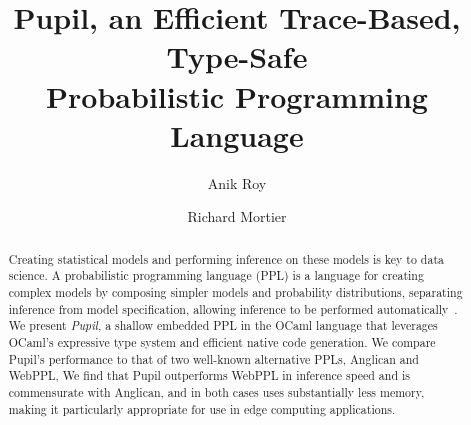 \documentclass[sigconf]{acmart}
\newcommand{\pupil}{Pupil\xspace}
\begin{document}
\title{
  \pupil, an Efficient Trace-Based, Type-Safe \\
  Probabilistic Programming Language
}

\author{Anik Roy}

\author{Richard Mortier}


\begin{abstract}
  Creating statistical models and performing inference on these models is key to data science. A probabilistic programming language (PPL) is a language for creating complex models by composing simpler models and probability distributions, separating inference from model specification, allowing inference to be performed automatically~\cite{gordon2014probabilistic}. We present \emph{\pupil}, a shallow embedded PPL in the OCaml language that leverages OCaml's expressive type system and efficient native code generation. We compare \pupil's performance to that of two well-known alternative PPLs, Anglican and WebPPL, We find that \pupil outperforms WebPPL in inference speed and is commensurate with Anglican, and in both cases uses substantially less memory, making it particularly appropriate for use in edge computing applications.
\end{abstract}
\end{document}
